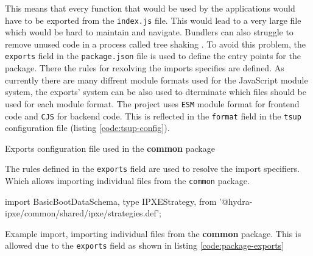 \documentclass[../main.tex]{subfiles}
\begin{document}
This means that every function that would be used by the applications would have to be exported from the \texttt{index.js} file.
This would lead to a very large file which would be hard to maintain and navigate. Bundlers can also struggle to remove unused code in a process called tree shaking \cite{tree-shaking}.
To avoid this problem, the \texttt{exports} field in the \texttt{package.json} file is used to define the entry points for the package.
There the rules for rexolving the imports specifies are defined. As currently there are many diffrent module formats used for the JavaScript module system,
the exports' system can be also used to dterminate which files should be used for each module format. The project uses \texttt{ESM} \cite{esm} module format for frontend code and \texttt{CJS} \cite{cjs} for backend code.
This is reflected in the \texttt{format} field in the \texttt{tsup} configuration file (listing \ref{code:tsup-config}).

\begin{listing}[H]
  \caption{Exports configuration file used in the \textbf{common} package}
  \label{code:package-exports}
\end{listing}

The rules defined in the \texttt{exports} field are used to resolve the import specifiers. Which allows importing individual files from the \texttt{common} package.

\begin{listing}[H]
  \begin{tscode}
    import {
    BasicBootDataSchema,
    type IPXEStrategy,
    } from '@hydra-ipxe/common/shared/ipxe/strategies.def';
  \end{tscode}
  \caption{Example import, importing individual files from the \textbf{common} package. This is allowed due to the \texttt{exports} field as shown in listing \ref{code:package-exports}}
\end{listing}

\end{document}
